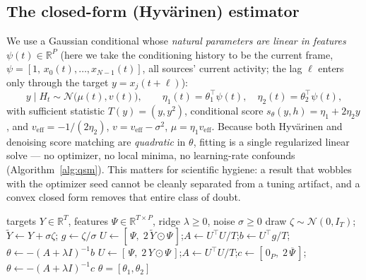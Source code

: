 \documentclass[11pt]{article}
\newcommand{\R}{\mathbb{R}}
\newcommand{\Hcal}{H}
\begin{document}
\subsection{The closed-form (Hyv\"arinen) estimator}
We use a Gaussian conditional whose \emph{natural parameters are linear in features}
$\psi(t)\in\R^P$ (here we take the conditioning history to be the current frame,
$\psi=[1,\,x_0(t),\dots,x_{N-1}(t)]$, all sources' current activity; the lag $\ell$ enters only
through the target $y=x_j(t{+}\ell)$):
\[
  y\mid\Hcal_t \sim \mathcal{N}\!\bigl(\mu(t), v(t)\bigr),\qquad
  \eta_1(t)=\theta_1^\top\psi(t),\quad \eta_2(t)=\theta_2^\top\psi(t),
\]
with sufficient statistic $T(y)=(y,y^2)$, conditional score $s_\theta(y,h)=\eta_1+2\eta_2 y$, and
$v_{\mathrm{eff}}=-1/(2\eta_2)$, $v=v_{\mathrm{eff}}-\sigma^2$, $\mu=\eta_1 v_{\mathrm{eff}}$. Because
both Hyv\"arinen and denoising score matching are \emph{quadratic} in $\theta$, fitting is a single
regularized linear solve --- no optimizer, no local minima, no learning-rate confounds
(Algorithm~\ref{alg:qsm}). This matters for scientific hygiene: a result that wobbles with the
optimizer seed cannot be cleanly separated from a tuning artifact, and a convex closed form removes
that entire class of doubt.

\begin{algorithm}[t]
\caption{Closed-form quadratic-$T$ conditional score matcher (one target)}
\label{alg:qsm}
\begin{algorithmic}[1]
\Require targets $Y\in\R^{T}$, features $\Psi\in\R^{T\times P}$, ridge $\lambda\ge0$, noise $\sigma\ge0$
 
  \State draw $\zeta\sim\mathcal{N}(0,I_T)$;\; $\tilde Y \gets Y+\sigma\zeta$;\; $g \gets \zeta/\sigma$
  \State $U \gets [\,\Psi,\; 2\,\tilde Y\odot\Psi\,]$;\quad $A \gets U^\top U/T$;\quad $b \gets U^\top g/T$;\quad $\theta \gets -(A+\lambda I)^{-1} b$
\Else {}
  \State $U \gets [\,\Psi,\; 2\,Y\odot\Psi\,]$;\quad $A \gets U^\top U/T$;\quad $c \gets [\,0_P,\; 2\,\overline{\Psi}\,]$;\quad $\theta \gets -(A+\lambda I)^{-1} c$
\EndIf
\State \Return $\theta=[\theta_1,\theta_2]$ 
\end{algorithmic}
\end{algorithm}
\end{document}
